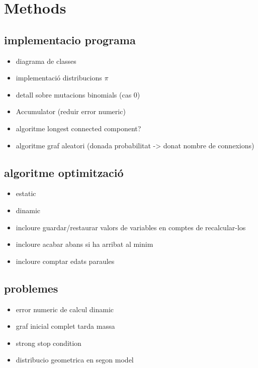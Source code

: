 \chapter{Methods}
\section{implementacio programa}
\begin{itemize}
\item diagrama de classes
\item implementació distribucions $\pi$
\item detall sobre mutacions binomials (cas 0)
\item Accumulator (reduir error numeric)
\item algoritme longest connected component?
\item algoritme graf aleatori (donada probabilitat -> donat nombre de
  connexions)
\end{itemize}
\section{algoritme optimització}
\begin{itemize}
\item estatic
\item dinamic
\item incloure guardar/restaurar valors de variables en comptes de
  recalcular-los
\item incloure acabar abans si ha arribat al minim
\item incloure comptar edats paraules
\end{itemize}
\section{problemes}
\begin{itemize}
\item error numeric de calcul dinamic
\item graf inicial complet tarda massa
\item strong stop condition
\item distribucio geometrica en segon model
\end{itemize}

